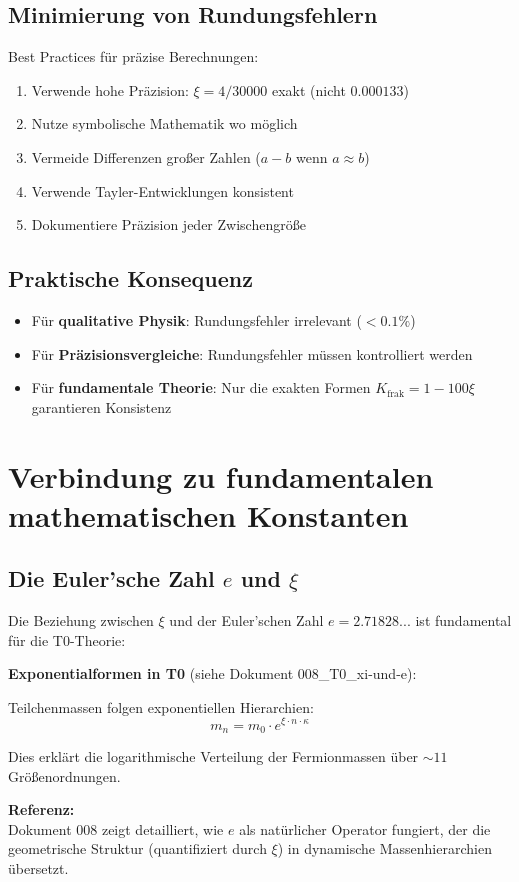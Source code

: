 	\subsection{Minimierung von Rundungsfehlern}
	
	Best Practices für präzise Berechnungen:
	\begin{enumerate}
		\item Verwende hohe Präzision: $\xi = 4/30000$ exakt (nicht $0.000133$)
		\item Nutze symbolische Mathematik wo möglich
		\item Vermeide Differenzen großer Zahlen ($a - b$ wenn $a \approx b$)
		\item Verwende Tayler-Entwicklungen konsistent
		\item Dokumentiere Präzision jeder Zwischengröße
	\end{enumerate}
	
	\subsection{Praktische Konsequenz}
	
	\begin{itemize}
		\item Für \textbf{qualitative Physik}: Rundungsfehler irrelevant ($< 0.1\%$)
		\item Für \textbf{Präzisionsvergleiche}: Rundungsfehler müssen kontrolliert werden
		\item Für \textbf{fundamentale Theorie}: Nur die exakten Formen $K_{\text{frak}} = 1 - 100\xi$ garantieren Konsistenz
	\end{itemize}
	
	\section{Verbindung zu fundamentalen mathematischen Konstanten}
	
	\subsection{Die Euler'sche Zahl $e$ und $\xi$}
	
	Die Beziehung zwischen $\xi$ und der Euler'schen Zahl $e = 2.71828...$ ist fundamental für die T0-Theorie:
	
	\begin{beziehung}
		\textbf{Exponentialformen in T0} (siehe Dokument 008\_T0\_xi-und-e):
		
		Teilchenmassen folgen exponentiellen Hierarchien:
		\begin{equation}
			m_n = m_0 \cdot e^{\xi \cdot n \cdot \kappa}
		\end{equation}
		
		Dies erklärt die logarithmische Verteilung der Fermionmassen über $\sim 11$ Größenordnungen.
		
		\textbf{Referenz:} \\

		Dokument 008 zeigt detailliert, wie $e$ als natürlicher Operator fungiert, der die geometrische Struktur (quantifiziert durch $\xi$) in dynamische Massenhierarchien übersetzt.
	\end{beziehung}
	
